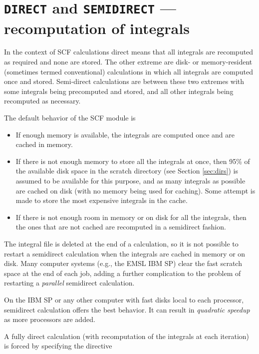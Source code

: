 \section{{\tt DIRECT} and {\tt SEMIDIRECT} --- recomputation of integrals}
\label{sec:semidirect}

In the context of SCF calculations direct means that all integrals are
recomputed as required and none are stored.  The other extreme are
disk- or memory-resident (sometimes termed conventional) calculations
in which all integrals are computed once and stored.  Semi-direct
calculations are between these two extremes with some integrals being
precomputed and stored, and all other integrals being recomputed as
necessary.

The default behavior of the SCF module is
\begin{itemize}
\item If enough memory is available, the integrals are computed once
  and are cached in memory.
\item If there is not enough memory to store all the integrals at
  once, then 95\% of the available disk space in the scratch directory
  (see Section \ref{sec:dirs}) is assumed to be available for this
  purpose, and as many integrals as possible are cached on disk (with
  no memory being used for caching).  Some attempt is made to store
  the most expensive integrals in the cache.  
 \item If there is not enough room in memory or on disk for all the
   integrals, then the ones that are not cached are recomputed in a
   semidirect fashion.
\end{itemize}

The integral file is deleted at the end of a calculation, so it is not
possible to restart a semidirect calculation when the integrals are
cached in memory or on disk.  Many computer systems (e.g., the EMSL
IBM SP) clear the fast scratch space at the end of each job, adding a
further complication to the problem of restarting a {\em parallel}
semidirect calculation.


On the IBM SP or any other computer with fast disks local to each
processor, semidirect calculation offers the best behavior.  It can
result in {\em quadratic speedup} as more processors are added.  

A fully direct calculation (with recomputation of the integrals at
each iteration) is forced by specifying the directive

